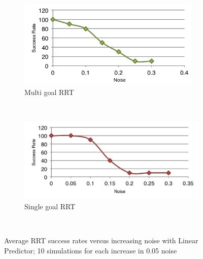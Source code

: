 \documentclass[letterpaper, 10 pt, conference]{ieeeconf}  %
\begin{document}
\begin{figure}
        \centering
        \begin{subfigure}[b]{0.22\textwidth}
                \centering
                \includegraphics[width=\textwidth]{fig/multi}
                \caption{Multi goal RRT}
                \label{fig:multi}
        \end{subfigure}%
        ~ %
        \begin{subfigure}[b]{0.24\textwidth}
                \centering
                \includegraphics[width=\textwidth]{fig/single}
                \caption{Single goal RRT}
                \label{fig:single}
        \end{subfigure}
        ~ %
        \caption{Average RRT success rates versus increasing noise
        with Linear Predictor; 10 simulations for each increase in 0.05
      noise}\label{fig:rrts}
\end{figure}
\end{document}
